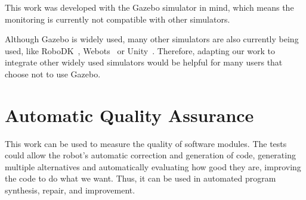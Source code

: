 This work was developed with the Gazebo simulator in mind, which means the monitoring is currently not compatible with other simulators.

Although Gazebo is widely used, many other simulators are also currently being used, like RoboDK~\cite{dkrobo}, Webots~\cite{webots} or Unity~\cite{unity}. Therefore, adapting our work to integrate other widely used simulators would be helpful for many users that choose not to use Gazebo.


\section{Automatic Quality Assurance}
\label{sec:autquaass}

This work can be used to measure the quality of software modules. The tests could allow the robot's automatic correction and generation of code, generating multiple alternatives and automatically evaluating how good they are, improving the code to do what we want. Thus, it can be used in automated program synthesis, repair, and improvement.
